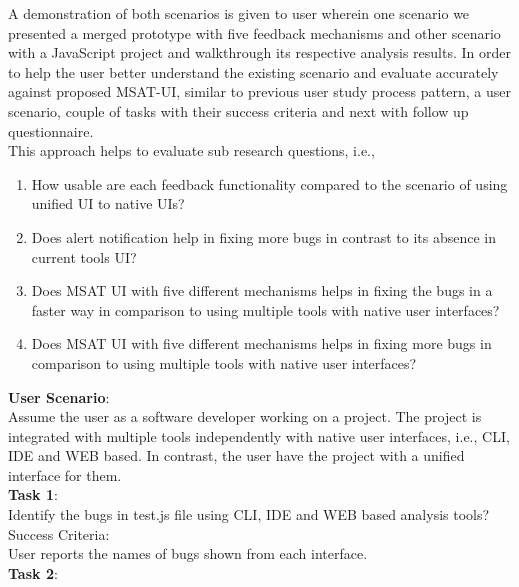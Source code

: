 A demonstration of both scenarios is given to user wherein one scenario we presented a merged prototype with five feedback mechanisms and other scenario with a JavaScript project and walkthrough its respective analysis results. In order to help the user better understand the existing scenario and evaluate accurately against proposed MSAT-UI, similar to previous user study process pattern, a user scenario, couple of tasks with their success criteria and next with follow up questionnaire. \\

This approach helps to evaluate sub research questions, i.e., \\

\begin{enumerate}
\item How usable are each feedback functionality compared to the scenario of using unified UI to native UIs?
\item Does alert notification help in fixing more bugs in contrast to its absence in current tools UI?
\item Does MSAT UI with five different mechanisms helps in fixing the bugs in a faster way in comparison to using multiple tools with native user interfaces?
\item Does MSAT UI with five different mechanisms helps in fixing more bugs in comparison to using multiple tools with native user interfaces?
\end{enumerate}

\textbf{User Scenario}: \\

Assume the user as a software developer working on a project. The project is integrated with multiple tools independently with native user interfaces, i.e., CLI, IDE and WEB based. In contrast, the user have the project with a unified interface for them. \\


\textbf{Task 1}: \\

Identify the bugs in test.js file using CLI, IDE and WEB based analysis tools? \\

Success Criteria: \\

User reports the names of bugs shown from each interface. \\


\textbf{Task 2}: \\

